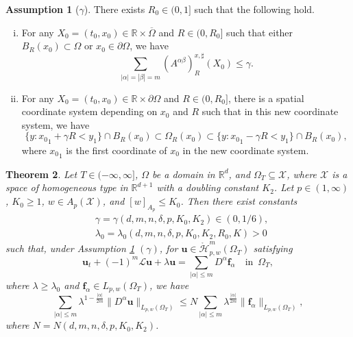 \documentclass[reqno]{amsart}
\numberwithin{equation}{section}
\theoremstyle{plain}
\newtheorem{theorem}{Theorem}[section]
\theoremstyle{definition}
\newtheorem{assumption}[theorem]{Assumption}
\theoremstyle{remark}
\begin{document}
\begin{assumption}[$\gamma$]		\label{0923.ass1}
There exists $R_0\in (0,1]$ such that the following hold.
\begin{enumerate}[(i)]
\item
For any $X_0=(t_0,x_0)\in{\mathbb{R}}\times \overline{\Omega}$ and $R\in(0,R_0]$ such that either $B_R(x_0)\subset \Omega$ or $x_0\in \partial \Omega$, we have
$$
\sum_{|\alpha|=|\beta|=m}(A^{\alpha\beta})^{x,\sharp}_R(X_0)\le \gamma.
$$
\item
For any $X_0=(t_0,x_0)\in {\mathbb{R}}\times \partial \Omega$ and $R\in (0,R_0]$, 
there is a spatial coordinate system depending on $x_0$ and $R$ such that in this new coordinate system, we have
\begin{equation*}		
\{y:{x_0}_1+\gamma R<y_1\}\cap B_R(x_0)\subset \Omega_R(x_0)\subset \{y:{x_0}_1-\gamma R<y_1\}\cap B_R(x_0),
\end{equation*}
where ${x_0}_1$ is the first coordinate of $x_0$ in the new coordinate system.
\end{enumerate}
\end{assumption}

\begin{theorem}		\label{1008@thm1}
Let $T\in (-\infty,\infty]$, $\Omega$  be a domain in ${\mathbb{R}}^d$, and $\Omega_T\subseteq {\mathcal{X}}$, where  ${\mathcal{X}}$ is  a space of homogeneous type in ${\mathbb{R}}^{d+1}$ with a doubling constant $K_2$.
Let $p\in (1,\infty)$, $K_0\ge 1$, $w\in A_p({\mathcal{X}})$, and $[w]_{A_p}\le K_0$.
Then there exist constants 
\begin{align*}
&\gamma=\gamma(d,m,n,\delta,p,K_0,K_2)\in (0,1/6),\\
&\lambda_0=\lambda_0(d,m,n,\delta,p, K_0,K_2, R_0,K)>0
\end{align*}
such that, under Assumption \ref{0923.ass1} $(\gamma)$, for ${\boldsymbol{u}}\in \mathring{\mathcal{H}}^m_{p,w}(\Omega_T)$ satisfying 
\begin{equation}	\label{160608@eq5}
{\boldsymbol{u}}_t+(-1)^m{\mathcal{L}}{\boldsymbol{u}}+\lambda{\boldsymbol{u}}=\sum_{|\alpha| \le m}D^\alpha {\boldsymbol{f}}_\alpha \quad \text{in }\, \Omega_T, 
\end{equation}
where $\lambda\ge \lambda_0$ and ${\boldsymbol{f}}_\alpha\in L_{p,w}(\Omega_T)$, we have 
\begin{equation}		\label{1017@e3a}
\sum_{|\alpha| \le m}\lambda^{1-\frac{|\alpha|}{2m}}\|D^\alpha {\boldsymbol{u}}\|_{L_{p,w}(\Omega_T)}\le N\sum_{|\alpha| \le m}\lambda^{\frac{|\alpha|}{2m}}\|{\boldsymbol{f}}_\alpha\|_{L_{p,w}(\Omega_T)},
\end{equation}
where $N=N(d,m,n,\delta,p,K_0,K_2)$.
\end{theorem}
\end{document}
